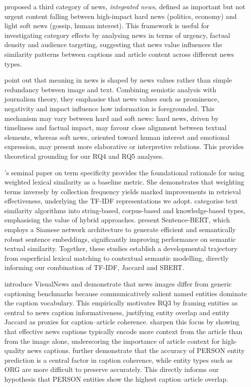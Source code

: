 \documentclass[11pt,a4paper]{article}
\begin{document}
\cite{LehmanWilzig2010} proposed a third category of news, \textit{integrated
news}, defined as important but not urgent content falling between high-impact
hard news (politics, economy) and light soft news (gossip, human interest).
This framework is useful for investigating category effects by analysing news
in terms of urgency, factual density and audience targeting, suggesting that
news value influences the similarity patterns between captions and article
content across different news types.

\citet{Cheema2023} point out that meaning in news is shaped by news values
rather than simple redundancy between image and text. Combining semiotic
analysis with journalism theory, they emphasise that news values such as
prominence, negativity and impact influence how information is foregrounded.
This mechanism may vary between hard and soft news: hard news, driven by
timeliness and factual impact, may favour close alignment between textual
elements, whereas soft news, oriented toward human interest and emotional
expression, may present more elaborative or interpretive relations. This
provides theoretical grounding for our RQ4 and RQ5 analyses.

\citet{SparckJones1972TermSpecificity}'s seminal paper on term specificity
provides the foundational rationale for using weighted lexical similarity as
a baseline metric. She demonstrates that weighting terms inversely by
collection frequency yields marked improvements in retrieval effectiveness,
underlying the TF-IDF representations we adopt. \citet{Gomaa2013} categorise
text similarity algorithms into string-based, corpus-based and knowledge-based
types, emphasising the value of hybrid approaches. \citet{Reimers2019} present
Sentence-BERT, which employs a Siamese network architecture to generate
efficient and semantically robust sentence embeddings, significantly improving
performance on semantic textual similarity. Together, these studies establish
a developmental trajectory from superficial lexical matching to contextual
semantic modelling, directly informing our combination of TF-IDF, Jaccard
and SBERT.

\citet{liu2021visualnews} introduce VisualNews and demonstrate that news
images differ from generic captioning benchmarks because communicatively
salient named entities dominate the caption vocabulary. This empirically
motivates RQ3 by framing entities as central to news caption informativeness,
justifying entity overlap and entity Jaccard as proxies for caption--article
coherence. \citet{Qu2024VACNIC} sharpen this focus by showing that effective
news captions typically encode more context from the article than from the
image alone, underscoring the importance of article context for high-quality
news captions. \citet{Tranetal2020} further demonstrate that the accuracy of
PERSON entity prediction is a central factor in caption coherence, while
entity types such as ORG are more difficult to preserve accurately. This
directly informs our hypothesis that PERSON entities show the highest
caption--article overlap.
\end{document}
